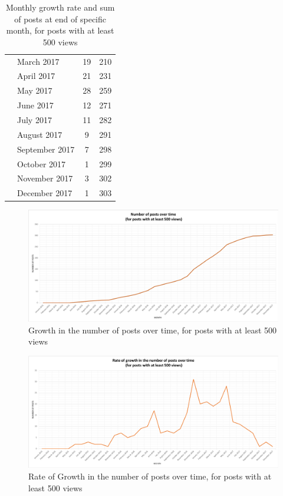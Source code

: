 \documentclass{sigchi}
\begin{document}
\begin{table}[H]
{\begin{tabular}{|c|l|c|c|}
 & March 2017 & 19 & 210 \\ \cline{2-4} 
 & April 2017 & 21 & 231 \\ \cline{2-4} 
 & May 2017 & 28 & 259 \\ \cline{2-4} 
 & June 2017 & 12 & 271 \\ \cline{2-4} 
 & July 2017 & 11 & 282 \\ \cline{2-4} 
 & August 2017 & 9 & 291 \\ \cline{2-4} 
 & September 2017 & 7 & 298 \\ \cline{2-4} 
 & October 2017 & 1 & 299 \\ \cline{2-4} 
 & November 2017 & 3 & 302 \\ \cline{2-4} 
 & December 2017 & 1 & 303 \\ \hline
\end{tabular}
}
\caption{Monthly growth rate and sum of posts at end of specific month, for posts with at least 500 views}
\label{table:GrowthRateAndGrowth500Views}
\end{table}

\pagebreak
\begin{figure}[ht]
	\centering
\includegraphics[width=\textwidth,height=\textheight,keepaspectratio]{RQ4-NumPostsOverTime_500Views.png}
    \caption{Growth in the number of posts over time, for posts with at least 500 views}
    \label{fig:3GrowthInNumPosts500Views}
\end{figure}
\begin{figure}[ht]
	\centering
\includegraphics[width=\textwidth,height=\textheight,keepaspectratio]{RQ4-RateNumPostsOverTime_500Views.png}
    \caption{Rate of Growth in the number of posts over time, for posts with at least 500 views}
    \label{fig:3.1RateGrowthInNumPosts500Views}
\end{figure}
\end{document}
